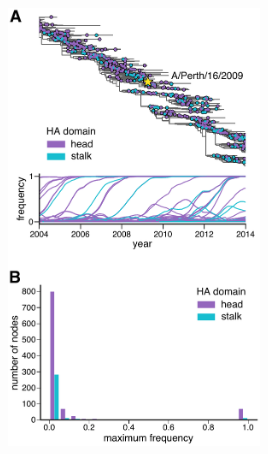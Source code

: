 \documentclass[9pt,twocolumn,twoside]{pnas-new}
\begin{document}
\begin{suppfigure}[H]
\centerline{\includegraphics[width=0.5\textwidth]{figs/supp_head_stalk_mutfreq/head_stalk_mutfreq.pdf}}
\caption{\label{suppfig:head_stalk_mutfreq_supp}
{\bf Frequency trajectories of head and stalk domain mutations.}
(A) This figure repeats the analysis of the H3N2 mutation frequencies in Figure~\ref{fig:frequency_trajectory}, but colors amino-acid mutations by whether they occur in the head (purple) or the stalk (blue) domain.
(B) Histogram of mutation maximum frequencies by the number of nodes for head and stalk domain mutations.
It is clear that mutations in the head domain are more numerous than those in the stalk, particularly among mutations that reach high frequencies.
}
\end{suppfigure}



\begin{suppdata}[H]
\caption{\label{suppdata:PerthHA}
Genbank file giving the full sequence of the bidirectional reverse-genetics plasmid pHW-Perth09-HA-G78D-T212I, which encodes the wildtype HA sequence used in this study.
}
\end{suppdata}

\begin{suppdata}[H]
\caption{\label{suppdata:bcsubamp_primers}
Excel file providing the primers used to generate the barcoded subamplicons for Perth/2009 HA deep sequencing.
}
\end{suppdata}
\end{document}
